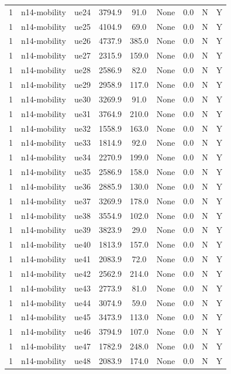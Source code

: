 \begin{table}[ht]
\begin{tabular}{|c|c|c|c|c|c|c|c|c|}
1 & n14-mobility & ue24 & 3794.9 & 91.0 & None & 0.0 & N & Y \\
1 & n14-mobility & ue25 & 4104.9 & 69.0 & None & 0.0 & N & Y \\
1 & n14-mobility & ue26 & 4737.9 & 385.0 & None & 0.0 & N & Y \\
1 & n14-mobility & ue27 & 2315.9 & 159.0 & None & 0.0 & N & Y \\
1 & n14-mobility & ue28 & 2586.9 & 82.0 & None & 0.0 & N & Y \\
1 & n14-mobility & ue29 & 2958.9 & 117.0 & None & 0.0 & N & Y \\
1 & n14-mobility & ue30 & 3269.9 & 91.0 & None & 0.0 & N & Y \\
1 & n14-mobility & ue31 & 3764.9 & 210.0 & None & 0.0 & N & Y \\
1 & n14-mobility & ue32 & 1558.9 & 163.0 & None & 0.0 & N & Y \\
1 & n14-mobility & ue33 & 1814.9 & 92.0 & None & 0.0 & N & Y \\
1 & n14-mobility & ue34 & 2270.9 & 199.0 & None & 0.0 & N & Y \\
1 & n14-mobility & ue35 & 2586.9 & 158.0 & None & 0.0 & N & Y \\
1 & n14-mobility & ue36 & 2885.9 & 130.0 & None & 0.0 & N & Y \\
1 & n14-mobility & ue37 & 3269.9 & 178.0 & None & 0.0 & N & Y \\
1 & n14-mobility & ue38 & 3554.9 & 102.0 & None & 0.0 & N & Y \\
1 & n14-mobility & ue39 & 3823.9 & 29.0 & None & 0.0 & N & Y \\
1 & n14-mobility & ue40 & 1813.9 & 157.0 & None & 0.0 & N & Y \\
1 & n14-mobility & ue41 & 2083.9 & 72.0 & None & 0.0 & N & Y \\
1 & n14-mobility & ue42 & 2562.9 & 214.0 & None & 0.0 & N & Y \\
1 & n14-mobility & ue43 & 2773.9 & 81.0 & None & 0.0 & N & Y \\
1 & n14-mobility & ue44 & 3074.9 & 59.0 & None & 0.0 & N & Y \\
1 & n14-mobility & ue45 & 3473.9 & 113.0 & None & 0.0 & N & Y \\
1 & n14-mobility & ue46 & 3794.9 & 107.0 & None & 0.0 & N & Y \\
1 & n14-mobility & ue47 & 1782.9 & 248.0 & None & 0.0 & N & Y \\
1 & n14-mobility & ue48 & 2083.9 & 174.0 & None & 0.0 & N & Y \\

\end{tabular}
\end{table}
